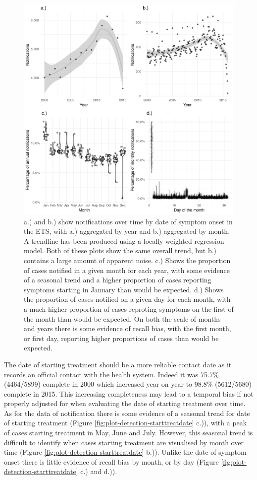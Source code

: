 \documentclass[11pt,twoside]{bristolthesis}
\begin{document}
  \begin{figure}
  
  {\centering \includegraphics[width=0.8\linewidth,]{chapters/tb-epi-england/figures/plot-detection-sympton} 
  
  }
  
  \caption[a.) and b.) show notifications over time by date of symptom onset in the ETS, with a.) aggregated by year and  b.) aggregated by month.]{a.) and b.) show notifications over time by date of symptom onset in the ETS, with a.) aggregated by year and  b.) aggregated by month. A trendline has been produced using a locally weighted regression model. Both of these plots show the same overall trend, but b.) contains a large amount of apparent noise. c.) Shows the proportion of cases notified in a given month for each year, with some evidence of a seasonal trend and a higher proportion of cases reporting symptoms starting in January than would be expected. d.) Shows the proportion of cases notified on a given day for each month, with a much higher proportion of cases reproting symptoms on the first of the month than would be expected. On both the scale of months and years there is some evidence of recall bias, with the first month, or first day, reporting higher proportions of cases than would be expected.}\label{fig:plot-detection-sympton}
  \end{figure}
  The date of starting treatment should be a more reliable contact date as it records an official contact with the health system. Indeed it was 75.7\% (4464/5899) complete in 2000 which increased year on year to 98.8\% (5612/5680) complete in 2015. This increasing completeness may lead to a temporal bias if not properly adjusted for when evaluating the date of starting treatment over time. As for the data of notification there is some evidence of a seasonal trend for date of starting treatment (Figure \ref{fig:plot-detection-starttreatdate} c.)), with a peak of cases starting treatment in May, June and July. However, this seasonal trend is difficult to identify when cases starting treatment are visualised by month over time (Figure \ref{fig:plot-detection-starttreatdate} b.)). Unlike the date of symptom onset there is little evidence of recall bias by month, or by day (Figure \ref{fig:plot-detection-starttreatdate} c.) and d.)).
\end{document}
